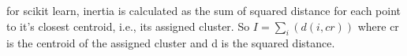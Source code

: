 \documentclass[SKL-MASTER.tex]{subfiles}
\begin{document}
for scikit learn, inertia is calculated as the sum of squared distance for each point to it's closest centroid, i.e., its assigned cluster. So $I = \sum_{i}(d(i,cr))$ where cr is the centroid of the assigned cluster and d is the squared distance.
%
%
\end{document}
